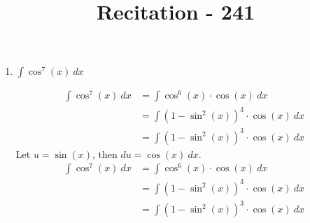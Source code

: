 \documentclass[12pt]{article}
\title{Recitation - 241
}
\renewcommand{\c}{\cos}
\newcommand{\s}{\sin}
\begin{document}
\maketitle
\makebox[\linewidth]{\rule{200mm}{1pt}}
\vspace{1mm}

\begin{enumerate}

\item $\int{\c^7(x)\ dx}$

\begin{mybox}

    \begin{align*}
        \int{\c^7(x)\ dx}   &=\int{\c^6(x)\cdot\c(x)\ dx}\\
                            &=\int{\left(1-\s^2(x)\right)^3\cdot\c(x)\ dx}\\
                            &=\int{\left(1-\s^2(x)\right)^3\cdot\c(x)\ dx}
    \end{align*}
    Let $u=\s(x)$, then $du = \c(x)\ dx$.
    \begin{align*}
        \int{\c^7(x)\ dx}   &=\int{\c^6(x)\cdot\c(x)\ dx}\\
                            &=\int{\left(1-\s^2(x)\right)^3\cdot\c(x)\ dx}\\
                            &=\int{\left(1-\s^2(x)\right)^3\cdot\c(x)\ dx}
    \end{align*}
\end{mybox}

\end{enumerate}
\end{document}
